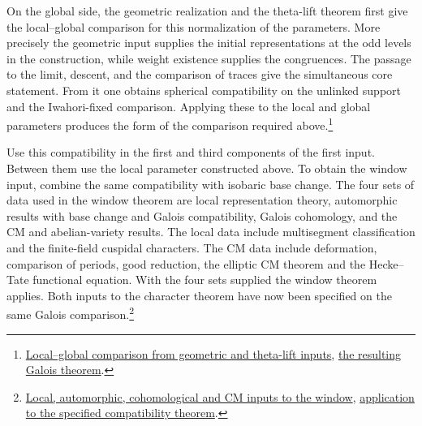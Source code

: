 On the global side, the geometric realization and the theta-lift
theorem first give the local--global comparison for this normalization
of the parameters. More precisely the geometric input supplies the
initial representations at the odd levels in the construction, while
weight existence supplies the congruences. The passage to the limit,
descent, and the comparison of traces give the simultaneous core
statement. From it one obtains spherical compatibility on the unlinked
support and the Iwahori-fixed comparison. Applying these to the local
and global parameters produces the form of the comparison required
above.\footnote{\href{https://github.com/Deicyde/riemann-hypothesis/blob/40e56bab/src/Development/AutomorphicArithmetic/Foundations/GaloisRepresentations/IntegralStructures/Development.lean\#L18-L31}{Local--global comparison from geometric and theta-lift inputs},
\href{https://github.com/Deicyde/riemann-hypothesis/blob/40e56bab/src/Development/AutomorphicArithmetic/Foundations/GaloisRepresentations/IntegralStructures/RowSrc.lean\#L4-L8}{the resulting Galois theorem}.}

Use this compatibility in the first and third components of the first
input. Between them use the local parameter constructed above. To
obtain the window input, combine the same compatibility with isobaric
base change. The four sets of data used in the window theorem are local
representation theory, automorphic results with base change and Galois
compatibility, Galois cohomology, and the CM and abelian-variety
results. The local data include multisegment classification and the
finite-field cuspidal characters. The CM data include deformation,
comparison of periods, good reduction, the elliptic CM theorem and the
Hecke--Tate functional equation. With the four sets supplied the
window theorem applies. Both inputs to the character theorem have now
been specified on the same Galois comparison.\footnote{\href{https://github.com/Deicyde/riemann-hypothesis/blob/40e56bab/src/Development/AutomorphicArithmetic/AutomorphicVarieties/ModularityArgument/ThresholdArguments/DenseThresholdCases/TopMainZj.lean\#L18-L74}{Local, automorphic, cohomological and CM inputs to the window},
\href{https://github.com/Deicyde/riemann-hypothesis/blob/40e56bab/src/Development/AutomorphicArithmetic/AutomorphicVarieties/ModularityArgument/ThresholdArguments/DenseThresholdCases/VwinOfRow.lean\#L4-L5}{application to the specified compatibility theorem}.}

